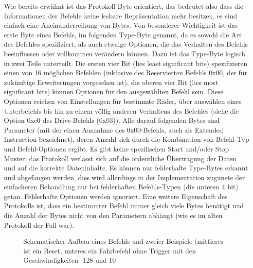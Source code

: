 \documentclass[a4paper]{article}
\begin{document}
	Wie bereits erwähnt ist das Protokoll Byte-orientiert, das bedeutet also dass die Informationen der Befehle keine
	lesbare Repräsentation mehr besitzen, es sind einfach eine Aneinanderreihung von Bytes. Von besonderer Wichtigkeit
	ist das erste Byte eines Befehls, im folgenden Type-Byte genannt, da es sowohl die Art des Befehles spezifiziert, als
	auch etwaige Optionen, die das Verhalten des Befehls beeinflussen oder vollkommen verändern können. Dazu ist das Type-Byte
	logisch in zwei Teile unterteilt. Die ersten vier Bit (lies least significant bits) spezifizieren einen von 16 möglichen
	Befehlen (inklusive des Reservierten Befehls 0x00, der für zukünftige Erweiterungen vorgesehen ist), die oberen vier Bit 
	(lies most significant bits) können Optionen für den ausgewählten Befehl sein. Diese Optionen reichen von Einstellungen
	für bestimmte Räder, über auswählen eines Unterbefehls bis hin zu einem völlig anderen Verhaltens des Befehles (siehe
	die Option 0xc0 des Drive-Befehls (0x03)). Alle darauf folgenden Bytes sind Parameter (mit der einen Ausnahme des
	0x00-Befehls, auch als Extended Instruction bezeichnet), deren Anzahl sich durch die Kombination von Befehl-Typ und
	Befehl-Optionen ergibt.
	Es gibt keine spezifischen Start und/oder Stop Muster, das Protokoll verlässt sich auf die ordentliche Übertragung
	der Daten und auf die korrekte Dateninhalte. Es können nur fehlerhafte Type-Bytes erkannt und abgefangen werden, dies wird
	allerdings in der Implementation zugunste der einfacheren Behandlung nur bei fehlerhaften Befehls-Typen (die unteren 4 bit) getan.
	Fehlerhafte Optionen werden ignoriert.
	Eine weitere Eigenschaft des Protokolls ist, dass ein bestimmter Befehl immer gleich viele Bytes benötigt und die Anzahl
	der Bytes nicht von den Parametern abhängt (wie es im alten Protokoll der Fall war).
	\begin{figure}[!ht]
		\centering
		\caption{Schematischer Aufbau eines Befehls und zweier Beispiele (mittleres ist ein Reset, unteres ein Fahrbefehl ohne
		Trigger mit den Geschwindigkeiten -128 und 10}
	\end{figure}
\end{document}

